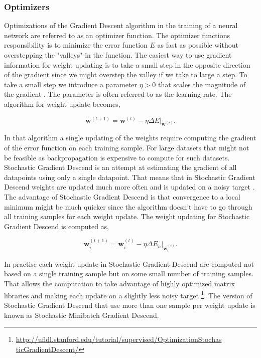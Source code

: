 \subsubsection{Optimizers}\label{sec:optimizers}

Optimizations of the Gradient Descent algorithm in the training of a neural
network are referred to as an optimizer function. The optimizer functions
responsibility is to minimize the error function $E$ as fast as possible
without overstepping the "valleys" in the function. The easiest way to use
gradient information for weight updating is to take a small step in the opposite
direction of the gradient since we might overstep the valley if we take to large
a step. To take a small step we introduce a parameter $\eta > 0$ that scales the
magnitude of the gradient \citep{Bishop}. The parameter is often referred to as
the learning rate. The algorithm for weight update becomes,

\begin{equation}
    \mathbf{w}^{(t+1)} =
        \mathbf{\mathbf{w}}^{(t)} -
        \eta\Delta E|_{\mathbf{w}^{(t)}}.
\end{equation}

In that algorithm a single updating of the weights require computing the
gradient of the error function on each training sample. For large datasets
that might not be feasible as backpropagation is expensive to compute for such
datasets. Stochastic Gradient Descend is an attempt at estimating the gradient
of all datapoints using only a single datapoint. That means that in Stochastic
Gradient Descend weights are updated much more often and is updated on a noisy
target \citep{Bishop}. The advantage of Stochastic Gradient Descend is that
convergence to a local minimum might be much quicker since the algorithm doesn't
have to go through all training samples for each weight update. The weight
updating for Stochastic Gradient Descend is computed as,

\begin{equation}
    \mathbf{w}^{(t+1)}_i =
        \mathbf{\mathbf{w}}^{(t)}_i -
        \eta\Delta E_n|_{\mathbf{w}^{(t)}_i}.
\end{equation}

In practise each weight update in Stochastic Gradient Descend are computed
not based on a single training sample but on some small number of training
samples. That allows the computation to take advantage of highly optimized
matrix libraries and making each update on a slightly less noisy target
\footnote{\url{http://ufldl.stanford.edu/tutorial/supervised/OptimizationStochas
ticGradientDescent/}}. The version of Stochastic Gradient Descend that use more
than one sample per weight update is known as Stochastic Minibatch Gradient
Descend.

